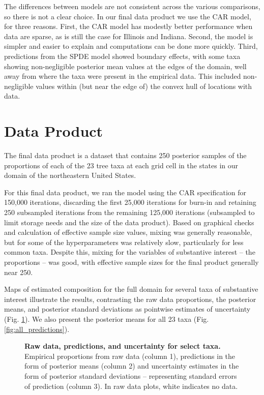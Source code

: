 \documentclass[10pt,letterpaper]{article}
\begin{document}
The differences between models are not consistent across the various
comparisons, so there is not a clear choice. In our final data product
we use the CAR model, for three reasons. First, the CAR model has
modestly better performance when data are sparse, as is still the
case for Illinois and Indiana. Second, the model is simpler and easier
to explain and computations can be done more quickly. Third, predictions
from the SPDE model showed boundary effects, with some taxa showing
non-negligible posterior mean values at the edges of the domain, well
away from where the taxa were present in the empirical data. This
included non-negligible values within (but near the edge of) the convex
hull of locations with data. 




\section*{Data Product\label{sec:Data-product}}

The final data product is a dataset that contains 250 posterior samples
of the proportions of each of the 23 tree taxa at each grid cell in
the states in our domain of the northeastern United States.

For this final data product, we ran the model using the CAR specification
for 150,000 iterations, discarding the first 25,000 iterations for
burn-in and retaining 250 subsampled iterations from the remaining
125,000 iterations (subsampled to limit storage needs and the size
of the data product). Based on graphical checks and calculation of
effective sample size values, mixing was generally reasonable, but
for some of the hyperparameters was relatively slow, particularly
for less common taxa. Despite this, mixing for the variables of substantive
interest -- the proportions -- was good, with effective sample sizes
for the final product generally near 250.

Maps of estimated composition for the full domain for several taxa
of substantive interest illustrate the results, contrasting the raw
data proportions, the posterior means, and posterior standard deviations
as pointwise estimates of uncertainty (Fig. \ref{fig:select_maps}).
We also present the posterior means for all 23 taxa (Fig. \ref{fig:all_predictions}).

\begin{figure}


\caption{{\bf Raw data, predictions, and uncertainty for select taxa.} 
\\Empirical proportions from raw data (column 1), predictions in the
form of posterior means (column 2) and uncertainty estimates in the
form of posterior standard deviations -- representing standard errors
of prediction (column 3). In raw data plots, white indicates no data.}
\label{fig:select_maps}
\end{figure}
\end{document}
